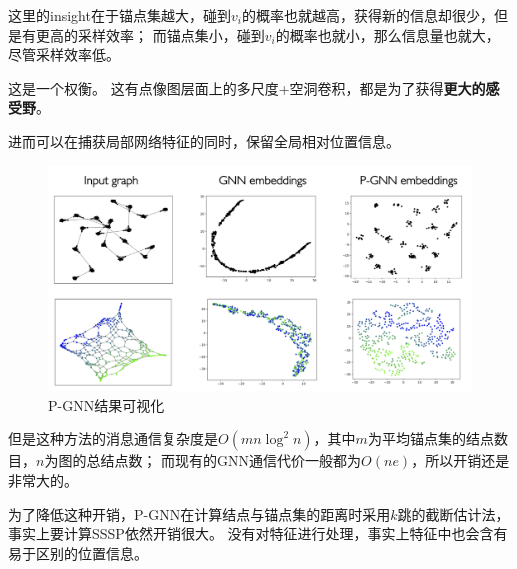 \documentclass[reportComp]{thesis}
\begin{document}
这里的insight在于锚点集越大，碰到$v_i$的概率也就越高，获得新的信息却很少，但是有更高的采样效率；
而锚点集小，碰到$v_i$的概率也就小，那么信息量也就大，尽管采样效率低。

这是一个权衡。
这有点像图层面上的多尺度+空洞卷积，都是为了获得\textbf{更大的感受野}。

进而可以在捕获局部网络特征的同时，保留全局相对位置信息。
\begin{figure}[H]
\centering
\includegraphics[width=0.8\linewidth]{fig/PGNN_results.png}
\caption{P-GNN结果可视化}
\end{figure}


但是这种方法的消息通信复杂度是$O(mn\log^2 n)$，其中$m$为平均锚点集的结点数目，$n$为图的总结点数；
而现有的GNN通信代价一般都为$O(ne)$，所以开销还是非常大的。

为了降低这种开销，P-GNN在计算结点与锚点集的距离时采用$k$跳的截断估计法，事实上要计算SSSP依然开销很大。
没有对特征进行处理，事实上特征中也会含有易于区别的位置信息。
\end{document}
